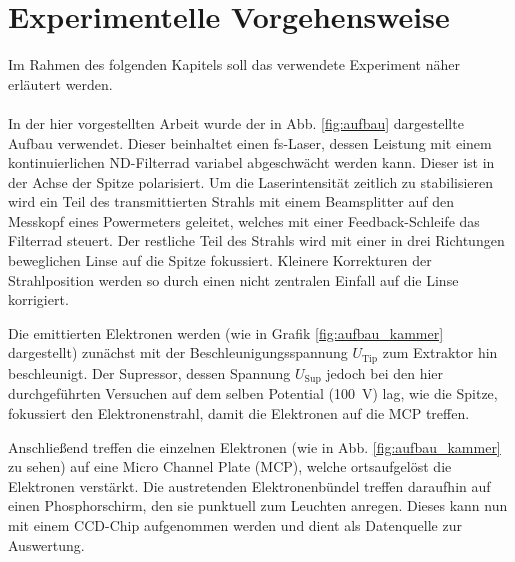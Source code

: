 \documentclass[bachelor,       %
               twoside,        %
               BCOR10mm,       %
               english,ngerman, %
               ]{GAUBM}
\begin{document}
 




\chapter{Experimentelle Vorgehensweise}
Im Rahmen des folgenden Kapitels soll das verwendete Experiment n\"aher erläutert werden.\\\\

In der hier vorgestellten Arbeit wurde der in Abb. \ref{fig:aufbau} dargestellte Aufbau verwendet.
Dieser beinhaltet einen fs-Laser, dessen Leistung mit einem kontinuierlichen ND-Filterrad variabel abgeschwächt werden kann.
Dieser ist in der Achse der Spitze polarisiert.
Um die Laserintensit\"at zeitlich zu stabilisieren wird ein Teil des transmittierten Strahls mit einem Beamsplitter auf den Messkopf eines Powermeters geleitet, welches mit einer Feedback-Schleife das Filterrad steuert.
Der restliche Teil des Strahls wird mit einer in drei Richtungen beweglichen Linse auf die Spitze fokussiert.
Kleinere Korrekturen der Strahlposition werden so durch einen nicht zentralen Einfall auf die Linse korrigiert.


Die emittierten Elektronen werden (wie in Grafik \ref{fig:aufbau_kammer} dargestellt) zunächst mit der Beschleunigungsspannung $U_\text{Tip}$ zum Extraktor hin beschleunigt.
Der Supressor, dessen Spannung $U_\text{Sup}$ jedoch bei den hier durchgeführten Versuchen auf dem selben Potential (\SI{100}{\V}) lag, wie die Spitze, fokussiert den Elektronenstrahl, damit die Elektronen auf die MCP treffen.\newline\newline

Anschließend treffen die einzelnen Elektronen (wie in Abb. \ref{fig:aufbau_kammer} zu sehen) auf eine Micro Channel Plate (MCP), welche ortsaufgelöst die Elektronen verstärkt.
Die austretenden Elektronenb\"undel treffen daraufhin auf einen Phosphorschirm, den sie punktuell zum Leuchten anregen.
Dieses kann nun mit einem CCD-Chip aufgenommen werden und dient als Datenquelle zur Auswertung.
\end{document}
